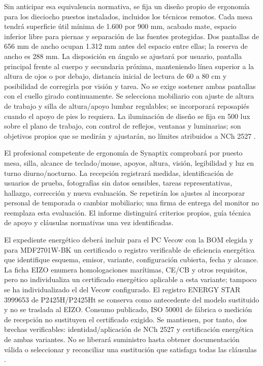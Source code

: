 Sin anticipar esa equivalencia normativa, se fija un diseño propio de ergonomía para los dieciocho puestos instalados, incluidos los técnicos remotos. Cada mesa tendrá superficie útil mínima de 1.600 por 900 mm, acabado mate, espacio inferior libre para piernas y separación de las fuentes protegidas. Dos pantallas de 656 mm de ancho ocupan 1.312 mm antes del espacio entre ellas; la reserva de ancho es 288 mm. La disposición en ángulo se ajustará por usuario, pantalla principal frente al cuerpo y secundaria próxima, manteniendo línea superior a la altura de ojos o por debajo, distancia inicial de lectura de 60 a 80 cm y posibilidad de corregirla por visión y tarea. No se exige sostener ambas pantallas con el cuello girado continuamente. Se selecciona mobiliario con ajuste de altura de trabajo y silla de altura/apoyo lumbar regulables; se incorporará reposapiés cuando el apoyo de pies lo requiera. La iluminación de diseño se fija en 500 lux sobre el plano de trabajo, con control de reflejos, ventanas y luminarias; son objetivos propios que se medirán y ajustarán, no límites atribuidos a NCh 2527 \parencites{p6-puestos-eizo,p4-isp-ergonomia}.

El profesional competente de ergonomía de Synaptix comprobará por puesto mesa, silla, alcance de teclado/mouse, apoyos, altura, visión, legibilidad y luz en turno diurno/nocturno. La recepción registrará medidas, identificación de usuarios de prueba, fotografías sin datos sensibles, tareas representativas, hallazgo, corrección y nueva evaluación. Se repetirán los ajustes al incorporar personal de temporada o cambiar mobiliario; una firma de entrega del monitor no reemplaza esta evaluación. El informe distinguirá criterios propios, guía técnica de apoyo y cláusulas normativas una vez identificadas.

El expediente energético deberá incluir para el PC Vecow con la BOM elegida y para MDF2701W-BK un certificado o registro verificable de eficiencia energética que identifique esquema, emisor, variante, configuración cubierta, fecha y alcance. La ficha EIZO enumera homologaciones marítimas, CE/CB y otros requisitos, pero no individualiza un certificado energético aplicable a esta variante; tampoco se ha individualizado el del Vecow configurado. El registro ENERGY STAR 3999653 de P2425H/P2425Ht se conserva como antecedente del modelo sustituido y no se traslada al EIZO. Consumo publicado, ISO 50001 de fábrica o medición de recepción no sustituyen el certificado exigido. Se mantienen, por tanto, dos brechas verificables: identidad/aplicación de NCh 2527 y certificación energética de ambas variantes. No se liberará suministro hasta obtener documentación válida o seleccionar y reconciliar una sustitución que satisfaga todas las cláusulas \parencites{p6-puestos-eizo,p9-vecow-datasheet-2025,p4-energystar-monitor}[RT-08.08]{pucv-transversal}.

